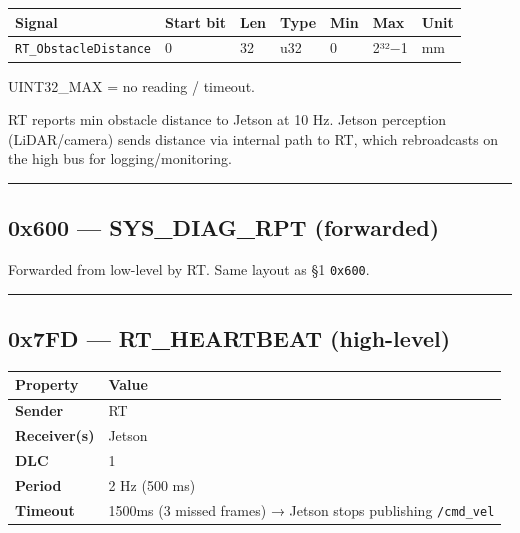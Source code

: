 \documentclass[12pt,a4paper,oneside]{report}
\begin{document}
\begin{longtable}[]{@{}lllllll@{}}
\toprule\noalign{}
Signal & Start bit & Len & Type & Min & Max & Unit \\
\midrule\noalign{}
\endhead
\bottomrule\noalign{}
\endlastfoot
\texttt{RT\_ObstacleDistance} & 0 & 32 & u32 & 0 & 2³²−1 & mm \\
\end{longtable}

UINT32\_MAX = no reading / timeout.

RT reports min obstacle distance to Jetson at 10 Hz. Jetson perception
(LiDAR/camera) sends distance via internal path to RT, which rebroadcasts on the
high bus for logging/monitoring.

\begin{center}\rule{0.5\linewidth}{0.5pt}\end{center}

\subsection{0x600 --- SYS\_DIAG\_RPT
(forwarded)}\label{x600-sys_diag_rpt-forwarded}

Forwarded from low-level by RT. Same layout as §1 \texttt{0x600}.

\begin{center}\rule{0.5\linewidth}{0.5pt}\end{center}

\subsection{0x7FD --- RT\_HEARTBEAT
(high-level)}\label{x7fd-rt_heartbeat-high-level}

\begin{longtable}[]{@{}ll@{}}
\toprule\noalign{}
Property & Value \\
\midrule\noalign{}
\endhead
\bottomrule\noalign{}
\endlastfoot
\textbf{Sender} & RT \\
\textbf{Receiver(s)} & Jetson \\
\textbf{DLC} & 1 \\
\textbf{Period} & 2 Hz (500 ms) \\
\textbf{Timeout} & 1500ms (3 missed frames) → Jetson stops publishing
\texttt{/cmd\_vel} \\
\end{longtable}
\end{document}
